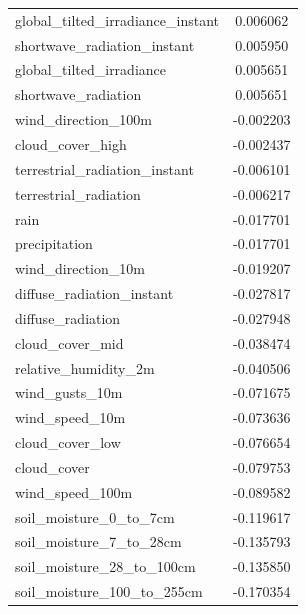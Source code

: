 \begin{table}[H]
\begin{tabular}{lc}
		global\_tilted\_irradiance\_instant    & 0.006062    \\ 
		shortwave\_radiation\_instant         & 0.005950    \\ 
		global\_tilted\_irradiance            & 0.005651    \\ 
		shortwave\_radiation                 & 0.005651    \\ 
		wind\_direction\_100m                & -0.002203   \\ 
		cloud\_cover\_high                   & -0.002437   \\ 
		terrestrial\_radiation\_instant      & -0.006101   \\ 
		terrestrial\_radiation              & -0.006217   \\ 
		rain                               & -0.017701   \\ 
		precipitation                      & -0.017701   \\ 
		wind\_direction\_10m                 & -0.019207   \\ 
		diffuse\_radiation\_instant          & -0.027817   \\ 
		diffuse\_radiation                  & -0.027948   \\ 
		cloud\_cover\_mid                    & -0.038474   \\ 
		relative\_humidity\_2m               & -0.040506   \\ 
		wind\_gusts\_10m                     & -0.071675   \\ 
		wind\_speed\_10m                     & -0.073636   \\ 
		cloud\_cover\_low                    & -0.076654   \\ 
		cloud\_cover                        & -0.079753   \\ 
		wind\_speed\_100m                    & -0.089582   \\ 
		soil\_moisture\_0\_to\_7cm             & -0.119617   \\ 
		soil\_moisture\_7\_to\_28cm            & -0.135793   \\ 
		soil\_moisture\_28\_to\_100cm          & -0.135850   \\ 
		soil\_moisture\_100\_to\_255cm         & -0.170354   \\ 
	\end{tabular}
\end{table}

